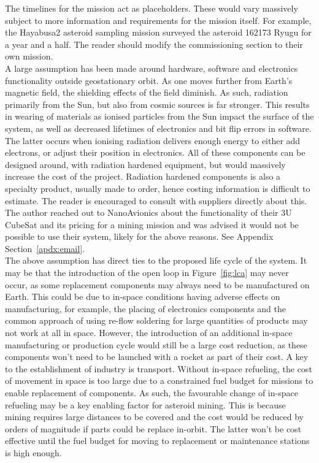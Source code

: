 \documentclass[conference]{IEEEtran}
\begin{document}
The timelines for the mission act as placeholders. These would vary massively subject to more information and requirements for the mission itself. For example, the Hayabusa2 asteroid sampling mission surveyed the asteroid 162173 Ryugu for a year and a half. The reader should modify the commissioning section to their own mission. \\

A large assumption has been made around hardware, software and electronics functionality outside geostationary orbit. As one moves further from Earth's magnetic field, the shielding effects of the field diminish. As such, radiation primarily from the Sun, but also from cosmic sources is far stronger. This results in wearing of materials as ionised particles from the Sun impact the surface of the system, as well as decreased lifetimes of electronics and bit flip errors in software. The latter occurs when ionising radiation delivers enough energy to either add electrons, or adjust their position in electronics. All of these components can be designed around, with radiation hardened equipment, but would massively increase the cost of the project. Radiation hardened components is also a specialty product, usually made to order, hence costing information is difficult to estimate. The reader is encouraged to consult with suppliers directly about this. The author reached out to NanoAvionics about the functionality of their 3U CubeSat and its pricing for a mining mission and was advised it would not be possible to use their system, likely for the above reasons. See Appendix Section~\ref{apdx:email}. \\

The above assumption has direct ties to the proposed life cycle of the system. It may be that the introduction of the open loop in Figure~\ref{fig:lca} may never occur, as some replacement components may always need to be manufactured on Earth. This could be due to in-space conditions having adverse effects on manufacturing, for example, the placing of electronics components and the common approach of using re-flow soldering for large quantities of products may not work at all in space. However, the introduction of an additional in-space manufacturing or production cycle would still be a large cost reduction, as these components won't need to be launched with a rocket as part of their cost. A key to the establishment of industry is transport. Without in-space refueling, the cost of movement in space is too large due to a constrained fuel budget for missions to enable replacement of components. As such, the favourable change of in-space refueling may be a key enabling factor for asteroid mining. This is because mining requires large distances to be covered and the cost would be reduced by orders of magnitude if parts could be replace in-orbit. The latter won't be cost effective until the fuel budget for moving to replacement or maintenance stations is high enough. \\
\end{document}
